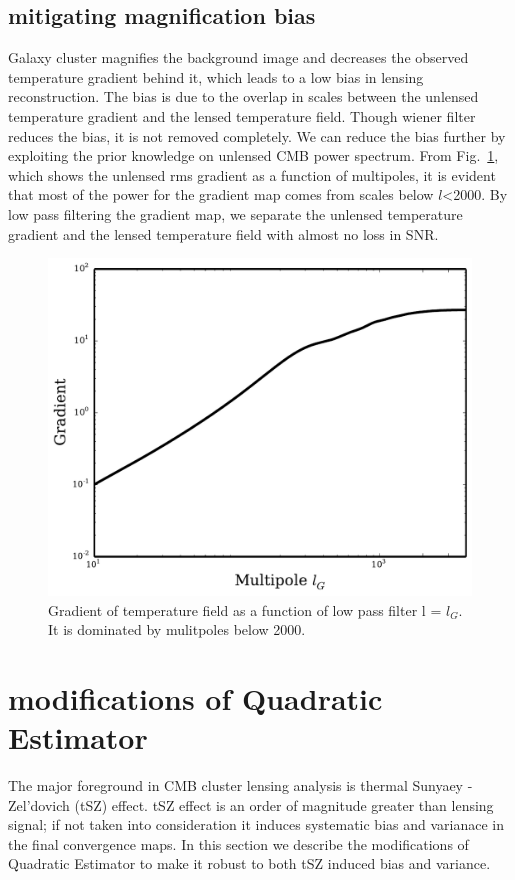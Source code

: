   \subsection{mitigating magnification bias}
Galaxy cluster magnifies the background image and decreases the observed temperature gradient behind it, which leads to a low bias in lensing reconstruction.
The bias is due to the overlap in scales between the unlensed temperature gradient and the lensed temperature field. 
Though wiener filter reduces the bias, it is not removed completely.
We can reduce the bias further by exploiting the prior knowledge on unlensed CMB power spectrum.
 From Fig.~\ref{fig:gradient_cut}, which shows the unlensed rms gradient as a function of multipoles, it is evident that most of the power for the gradient map comes from scales below $l$<2000.
 By low pass filtering the gradient map, we separate the unlensed temperature gradient and the lensed temperature field with almost no loss in SNR.
 \begin{figure}
\includegraphics[width=\linewidth]{figs/gradient_cut.pdf}
\caption{Gradient of temperature field as a function of low pass filter l = $l_{G}$. It is dominated by mulitpoles below 2000. }
\label{fig:gradient_cut}
\end{figure}

 
\section{modifications of Quadratic Estimator}
The major foreground in CMB cluster lensing analysis is thermal Sunyaey -Zel'dovich (tSZ) effect. 
tSZ effect is an order of magnitude greater than lensing signal; if not taken into consideration it induces systematic bias and varianace in the final convergence maps.
In this section we describe the modifications of Quadratic Estimator to make it robust to both tSZ induced bias and variance.

